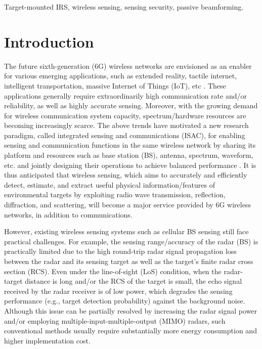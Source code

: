 \documentclass[10pt,final,doublecolumn]{IEEEtran}
\begin{document}
\begin{IEEEkeywords}
Target-mounted IRS, wireless sensing, sensing security, passive beamforming.
\end{IEEEkeywords}

\IEEEpeerreviewmaketitle

\section{Introduction}
The future sixth-generation (6G) wireless networks are envisioned as an enabler for various emerging applications, such as extended reality, tactile internet, intelligent transportation, massive Internet of Things (IoT), etc \cite{6G}. These applications generally require extraordinarily high communication rate and/or reliability, as well as highly accurate sensing. Moreover, with the growing demand for wireless communication system capacity, spectrum/hardware resources are becoming increasingly scarce. The above trends have motivated a new research paradigm, called integrated sensing and communications (ISAC), for enabling sensing and communication functions in the same wireless network by sharing its platform and resources such as base station (BS), antenna, spectrum, waveform, etc. and jointly designing their operations to achieve balanced performance \cite{zeng_wave, liuan,cui,use}. It is thus anticipated that wireless sensing, which aims to accurately and efficiently detect, estimate, and extract useful physical information/features of environmental targets by exploiting radio wave transmission, reflection, diffraction, and scattering, will become a major service provided by 6G wireless networks, in addition to communications.

However, existing wireless sensing systems such as cellular BS sensing still face practical challenges. For example, the sensing range/accuracy of the radar (BS) is practically limited due to the high round-trip radar signal propagation loss between the radar and its sensing target as well as the target's finite radar cross section (RCS). Even under the line-of-sight (LoS) condition, when the radar-target  distance is long and/or the RCS of the target is small, the echo signal received by the radar receiver is of low power, which degrades the sensing performance (e.g., target detection probability) against the background noise. Although this issue can be partially resolved by increasing the
radar signal power and/or employing multiple-input-multiple-output (MIMO) radars, such conventional methods usually require substantially more energy  consumption and higher implementation cost.
\end{document}
